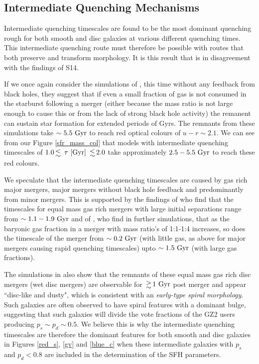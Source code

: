 \documentclass[useAMS,usenatbib]{mn2e}
\begin{document}
\subsection{Intermediate Quenching Mechanisms}
Intermediate quenching timescales are found to be the most dominant quenching rough for both smooth and disc galaxies at various different quenching times. This intermediate quenching route must therefore be possible with routes that both preserve and transform morphology. It is this result that is in disagreement with the findings of S14. 

If we once again consider the simulations of \citet{Springel05}, this time without any feedback from black holes, they suggest that if even a small fraction of gas is not consumed in the starburst following a merger (either because the mass ratio is not large enough to cause this or from the lack of strong black hole activity) the remanent can sustain star formation for extended periods of Gyrs. The remnants from these simulations take $\sim5.5~\rm{Gyr}$ to reach red optical colours of $u-r \sim 2.1$. We can see from our Figure \ref{sfr_mass_col} that models with intermediate quenching timescales of $1.0 \la ~\tau~\rm{[Gyr]} ~\la 2.0$ take approximately $2.5-5.5~\rm{Gyr}$ to reach these red colours.

We speculate that the intermediate quenching timescales are caused by gas rich major mergers, major mergers without black hole feedback and predominantly from minor mergers. This is supported by the findings of \citet{Lotz08}  who find that the timescales for equal mass gas rich mergers with large initial separations range from $\sim 1.1-1.9~\rm{Gyr}$ and of \citet{Lotz11}, who find in further simulations, that as the baryonic gas fraction in a merger with mass ratio's of 1:1-1:4 increases, so does the timescale of the merger from $\sim0.2~\rm{Gyr}$ (with little gas, as above for major mergers causing rapid quenching timescales) upto $\sim1.5~\rm{Gyr}$ (with large gas fractions). 

The simulations in \citet{Lotz08} also show that the remnants of these equal mass gas rich disc mergers (wet disc mergers) are observable for $\ga1~\rm{Gyr}$ post merger and appear ``disc-like and dusty", which is consistent with an \emph{early-type spiral morphology}.  Such galaxies are often observed to have spiral features with a dominant bulge, suggesting that such galaxies will divide the vote fractions of the GZ2 users producing $p_s \sim p_d \sim 0.5$. We believe this is why the intermediate quenching timescales are therefore the dominant features for both smooth and disc galaxies in Figures \ref{red_s}, \ref{gv} and \ref{blue_c} when these intermediate galaxies with $p_s$ and $p_d < 0.8$ are included in the determination of the SFH parameters. 
\end{document}
